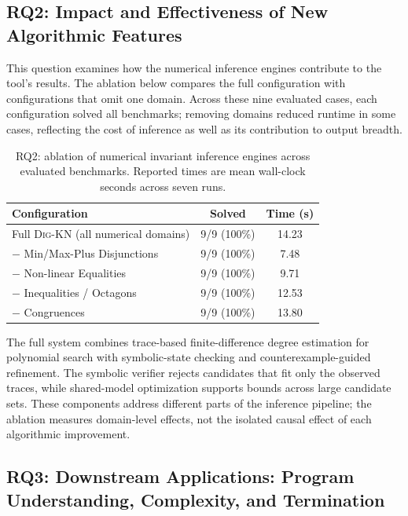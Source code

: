 \documentclass[runningheads]{llncs}
\newcommand{\tool}{\textsc{Dig-KN}\xspace}
\begin{document}
\subsection{RQ2: Impact and Effectiveness of New Algorithmic Features}
\label{sec:rq2}

This question examines how the numerical inference engines contribute to the tool's results. The ablation below compares the full configuration with configurations that omit one domain. Across these nine evaluated cases, each configuration solved all benchmarks; removing domains reduced runtime in some cases, reflecting the cost of inference as well as its contribution to output breadth.

\begin{table}[t]
\centering
\caption{RQ2: ablation of numerical invariant inference engines across evaluated benchmarks. Reported times are mean wall-clock seconds across seven runs.}
\label{tab:rq3}
\begin{tabular}{lcc}
\toprule
Configuration & Solved & Time (s) \\
\midrule
Full \tool{} (all numerical domains) & 9/9 (100\%) & 14.23 \\
$-$ Min/Max-Plus Disjunctions & 9/9 (100\%) & 7.48 \\
$-$ Non-linear Equalities & 9/9 (100\%) & 9.71 \\
$-$ Inequalities / Octagons & 9/9 (100\%) & 12.53 \\
$-$ Congruences & 9/9 (100\%) & 13.80 \\
\bottomrule
\end{tabular}
\end{table}

The full system combines trace-based finite-difference degree estimation for polynomial search with symbolic-state checking and counterexample-guided refinement. The symbolic verifier rejects candidates that fit only the observed traces, while shared-model optimization supports bounds across large candidate sets. These components address different parts of the inference pipeline; the ablation measures domain-level effects, not the isolated causal effect of each algorithmic improvement.

\subsection{RQ3: Downstream Applications: Program Understanding, Complexity, and Termination}
\label{sec:rq3}
\end{document}

